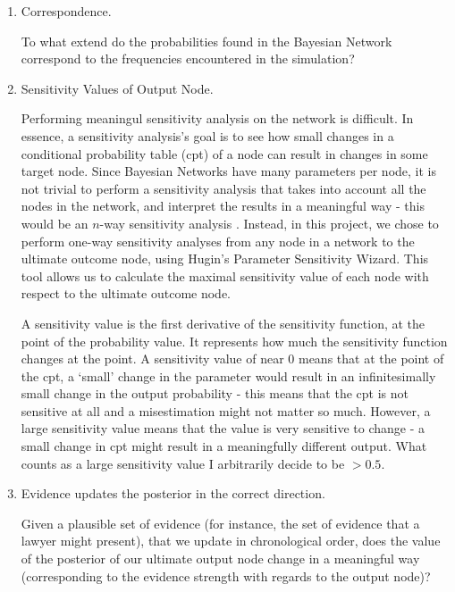 \begin{enumerate}
\item Correspondence.

To what extend do the probabilities found in the Bayesian Network correspond to the frequencies encountered in the simulation? 

\item Sensitivity Values of Output Node.

Performing meaningul sensitivity analysis on the network is difficult. In essence, a sensitivity analysis's goal is to see how small changes in a conditional probability table (cpt) of a node can result in changes in some target node. Since Bayesian Networks have many parameters per node, it is not trivial to perform a sensitivity analysis that takes into account all the nodes in the network, and interpret the results in a meaningful way - this would be an $n$-way sensitivity analysis \citep{gaag2007}.  Instead, in this project, we chose to perform one-way sensitivity analyses from any node in a network to the ultimate outcome node, using Hugin's Parameter Sensitivity Wizard. This tool allows us to calculate the maximal sensitivity value of each node with respect to the ultimate outcome node. 

A sensitivity value is the first derivative of the sensitivity function, at the point of the probability value. It represents how much the sensitivity function changes at the point. A sensitivity value of near 0 means that at the point of the cpt, a `small' change in the parameter would result in an infinitesimally small change in the output probability - this means that the cpt is not sensitive at all and a misestimation might not matter so much. However, a large sensitivity value means that the value is very sensitive to change - a small change in cpt might result in a meaningfully different output. What counts as a large sensitivity value I arbitrarily decide to be $>0.5$.



\item Evidence updates the posterior in the correct direction.

Given a plausible set of evidence (for instance, the set of evidence that a lawyer might present), that we update in chronological order, does the value of the posterior of our ultimate output node change in a meaningful way (corresponding to the evidence strength with regards to the output node)?

\end{enumerate}

